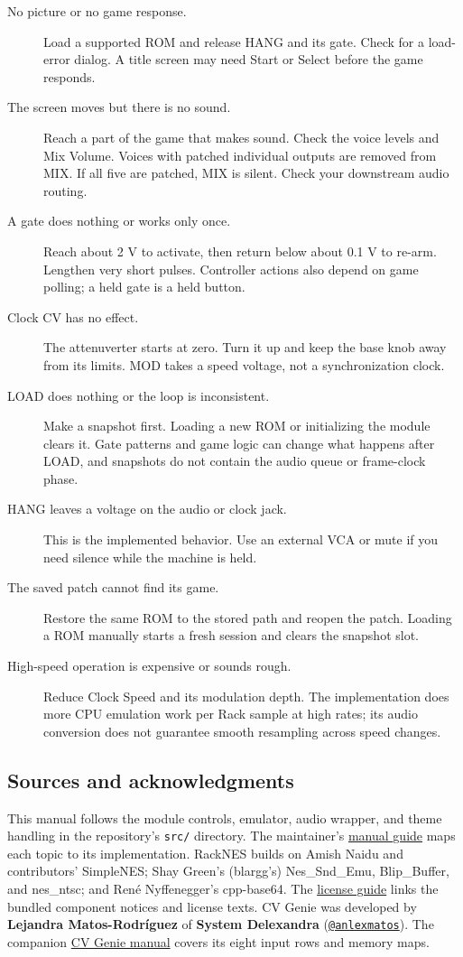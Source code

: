 \begin{description}
\item[No picture or no game response.]
Load a supported ROM and release HANG and its gate. Check for a load-error
dialog. A title screen may need Start or Select before the game responds.
\item[The screen moves but there is no sound.]
Reach a part of the game that makes sound. Check the voice levels and Mix
Volume. Voices with patched individual outputs are removed from MIX.
If all five are patched, MIX is silent. Check your downstream audio routing.
\item[A gate does nothing or works only once.]
Reach about 2 V to activate, then return below about 0.1 V to re-arm.
Lengthen very short pulses. Controller actions also depend on game polling;
a held gate is a held button.
\item[Clock CV has no effect.]
The attenuverter starts at zero. Turn it up and keep the base knob away
from its limits. MOD takes a speed voltage, not a synchronization clock.
\item[LOAD does nothing or the loop is inconsistent.]
Make a snapshot first. Loading a new ROM or initializing the module clears
it. Gate patterns and game logic can change what happens after LOAD, and
snapshots do not contain the audio queue or frame-clock phase.
\item[HANG leaves a voltage on the audio or clock jack.]
This is the implemented behavior. Use an external VCA or mute if you need
silence while the machine is held.
\item[The saved patch cannot find its game.]
Restore the same ROM to the stored path and reopen the patch. Loading a
ROM manually starts a fresh session and clears the snapshot slot.
\item[High-speed operation is expensive or sounds rough.]
Reduce Clock Speed and its modulation depth. The implementation does more
CPU emulation work per Rack sample at high rates; its audio conversion does
not guarantee smooth resampling across speed changes.
\end{description}

\subsection{Sources and acknowledgments}
This manual follows the module controls, emulator, audio wrapper, and theme
handling in the repository's \texttt{src/} directory. The maintainer's
\href{https://github.com/Arhythmetic-Units/RackNES/tree/master/manual}{manual guide}
maps each topic to its implementation.
RackNES builds on Amish Naidu and contributors' SimpleNES; Shay Green's
(blargg's) Nes\_Snd\_Emu, Blip\_Buffer, and nes\_ntsc; and Ren\'e
Nyffenegger's cpp-base64. The
\href{https://github.com/Arhythmetic-Units/RackNES/blob/master/LICENSING.md}{license guide}
links the bundled component notices and license texts. CV Genie was developed
by \textbf{Lejandra Matos-Rodr\'iguez} of \textbf{System Delexandra}
(\href{https://github.com/anlexmatos}{\texttt{@anlexmatos}}). The companion
\href{https://github.com/Arhythmetic-Units/RackNES/releases/latest/download/CVGenie.pdf}{CV Genie manual}
covers its eight input rows and memory maps.

